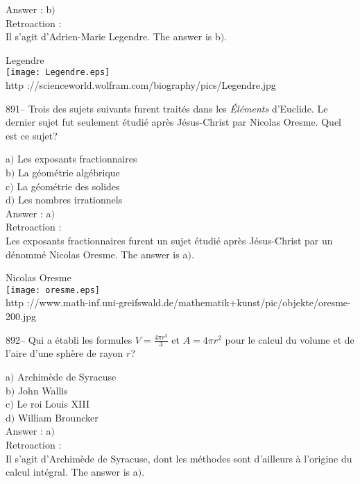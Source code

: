 ﻿\documentclass[letterpaper, 12pt]{article}
\begin{document}
Answer : b$)$\\

Retroaction : \\
Il s'agit d'Adrien-Marie Legendre. The answer is b$)$.

        \begin{center}
        Legendre\\
    \texttt{[image: Legendre.eps]}\\
        {\footnotesize http
://scienceworld.wolfram.com/biography/pics/Legendre.jpg}
    \end{center}

891-- Trois des sujets suivants furent trait\'es dans les {\sl
\'El\'ements} d'Euclide. Le dernier sujet fut seulement \'etudi\'e
apr\`es J\'esus-Christ par Nicolas Oresme. Quel est ce sujet?

a$)$ Les exposants fractionnaires \\
b$)$ La g\'eom\'etrie alg\'ebrique \\
c$)$ La g\'eom\'etrie des solides \\
d$)$ Les nombres irrationnels\\

Answer : a$)$\\

Retroaction : \\
Les exposants fractionnaires furent un sujet \'etudi\'e apr\`es
J\'esus-Christ par un d\'enomm\'e Nicolas Oresme. The answer is a$)$.\\

        \begin{center}
        Nicolas Oresme\\
    \texttt{[image: oresme.eps]}\\
        {\footnotesize http
://www.math-inf.uni-greifswald.de/mathematik+kunst/pic/objekte/oresme-200.jpg}
    \end{center}

892-- Qui a \'etabli les formules $V=\frac{4\pi r^3}3$ et $A=4\pi
r^2$ pour le calcul du volume et de l'aire d'une sph\`ere de rayon
$r$?

a$)$ Archim\`ede de Syracuse \\
b$)$ John Wallis \\
c$)$ Le roi Louis XIII \\
d$)$ William Brouncker\\

Answer : a$)$\\

Retroaction : \\
Il s'agit d'Archim\`ede de Syracuse, dont les m\'ethodes sont d'ailleurs \`a
l'origine du calcul int\'egral. The answer is a$)$.\\
\end{document}
